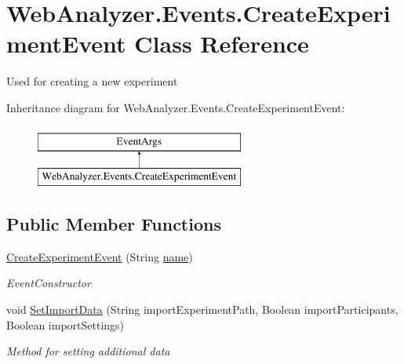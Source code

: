 \hypertarget{class_web_analyzer_1_1_events_1_1_create_experiment_event}{}\section{Web\+Analyzer.\+Events.\+Create\+Experiment\+Event Class Reference}
\label{class_web_analyzer_1_1_events_1_1_create_experiment_event}


Used for creating a new experiment  


Inheritance diagram for Web\+Analyzer.\+Events.\+Create\+Experiment\+Event\+:\begin{figure}[H]
\begin{center}
\leavevmode
\includegraphics[height=2.000000cm]{class_web_analyzer_1_1_events_1_1_create_experiment_event}
\end{center}
\end{figure}
\subsection*{Public Member Functions}
\begin{DoxyCompactItemize}
\item 
\hyperlink{class_web_analyzer_1_1_events_1_1_create_experiment_event_a5f3b337a20585c39e7e0470429807d23}{Create\+Experiment\+Event} (String \hyperlink{_u_i_2_h_t_m_l_resources_2js_2src_2create__experiment_8js_adac2bcb4f01b574cbc63fe8ee2c56bf0}{name})
\begin{DoxyCompactList}\small\item\em Event\+Constructor \end{DoxyCompactList}\item 
void \hyperlink{class_web_analyzer_1_1_events_1_1_create_experiment_event_a4b2a92153369ad87f92fd19b1ae8398a}{Set\+Import\+Data} (String import\+Experiment\+Path, Boolean import\+Participants, Boolean import\+Settings)
\begin{DoxyCompactList}\small\item\em Method for setting additional data \end{DoxyCompactList}\end{DoxyCompactItemize}
